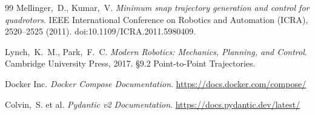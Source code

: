 \begin{thebibliography}{99}
Mellinger,~D., Kumar,~V.
\textit{Minimum snap trajectory generation and control for quadrotors}.
IEEE International Conference on Robotics and Automation (ICRA), 2520–2525 (2011).
doi:10.1109/ICRA.2011.5980409.

Lynch,~K.~M., Park,~F.~C.
\textit{Modern Robotics: Mechanics, Planning, and Control}.
Cambridge University Press, 2017.
§9.2 Point-to-Point Trajectories.

Docker Inc.
\textit{Docker Compose Documentation}.
\url{https://docs.docker.com/compose/}

Colvin,~S. et al.
\textit{Pydantic v2 Documentation}.
\url{https://docs.pydantic.dev/latest/}

\end{thebibliography}
